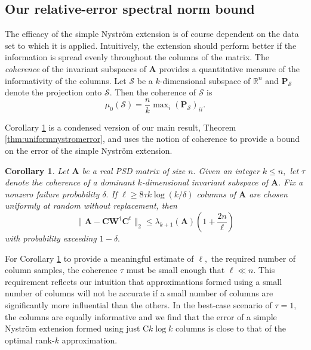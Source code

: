 \documentclass[11pt,letterpaper,twoside,reqno,nosumlimits]{amsart}
\newcommand{\mat}[1]{\ensuremath{\bm{#1}}}
\newcommand{\R}{\ensuremath{\mathbb{R}}}
\newtheorem{cor}{Corollary}
\theoremstyle{remark}
\begin{document}
\subsection{Our relative-error spectral norm bound}The efficacy of the simple Nystr\"om extension is of course dependent on the data set to which it is applied. Intuitively, the extension should perform better if the information is spread evenly throughout the columns of the matrix. The \emph{coherence} of the invariant subspaces of $\mat{A}$ provides a quantitative measure of the informativity of the columns. Let $\mathcal{S}$ be a $k$-dimensional subspace of $\R^n$ and $\mat{P}_{\mathcal{S}}$ denote the projection onto $\mathcal{S}.$ Then the coherence of $\mathcal{S}$ is
\[
 \mu_0(\mathcal{S}) = \frac{n}{k} \max\nolimits_i (\mat{P}_{\mathcal{S}})_{ii}.
\]

Corollary \ref{cor:simpleuniformnystromerror} is a condensed version of our main result, Theorem \ref{thm:uniformnystromerror}, and uses the notion of coherence to provide a bound on the error of the simple Nystr\"om extension. 
\begin{cor}
 Let $\mat{A}$ be a real PSD matrix of size $n.$ Given an integer $k \leq n,$ let
$\tau$ denote the coherence of a dominant  $k$-dimensional invariant subspace of $\mat{A}.$
Fix a nonzero failure probability $\delta.$ If $\ell \geq 8 \tau k \log(k/\delta)$ columns of $\mat{A}$ are chosen uniformly at random without replacement, then 
\[
\|\mat{A} - \mat{C} \mat{W}^\dagger \mat{C}^t \|_2 \leq \lambda_{k+1}(\mat{A}) \left(1 + \frac{2n}{\ell} \right) 
\]
with probability exceeding $1-\delta.$
\label{cor:simpleuniformnystromerror}
\end{cor}
For Corollary \ref{cor:simpleuniformnystromerror} to provide a meaningful estimate of $\ell,$ the required number of column samples, the coherence $\tau$ must be small enough that $\ell \ll n.$ This requirement reflects our intuition that approximations formed using a small number of columns will not be accurate if a small number of columns are significantly more influential than the others. In the best-case scenario of $\tau=1,$ the columns are equally informative and we find that the error of a simple Nystr\"om extension formed using just $\mathrm{C} k \log k$ columns is close to that of the optimal rank-$k$ approximation.
\end{document}

